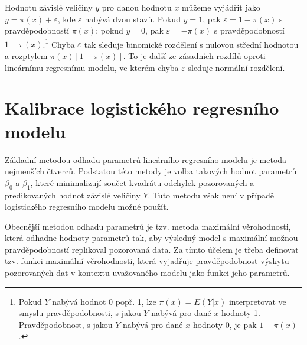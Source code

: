 Hodnotu závislé veličiny $y$ pro danou hodnotu $x$ můžeme vyjádřit jako $y = \pi(x) + \varepsilon$, kde $\varepsilon$ nabývá dvou stavů. Pokud $y = 1$, pak $\varepsilon = 1 -\pi(x)$ s pravděpodobností $\pi(x)$; pokud $y = 0$, pak $\varepsilon = -\pi(x)$ s pravděpodobností $1 - \pi(x)$.\footnote{Pokud $Y$ nabývá hodnot 0 popř. 1, lze $\pi(x) = E(Y | x)$ interpretovat ve smyslu pravděpodobnosti, s jakou $Y$ nabývá pro dané $x$ hodnoty 1. Pravděpodobnost, s jakou $Y$ nabývá pro dané $x$ hodnoty 0, je pak $1 - \pi(x)$.} Chyba $\varepsilon$ tak sleduje binomické rozdělení s nulovou střední hodnotou a rozptylem $\pi(x)[1 - \pi(x)]$. To je další ze zásadních rozdílů oproti lineárnímu regresnímu modelu, ve kterém chyba $\varepsilon$ sleduje normální rozdělení.

\section{Kalibrace logistického regresního modelu}

Základní metodou odhadu parametrů lineárního regresního modelu je metoda nejmenších čtverců. Podstatou této metody je volba takových hodnot parametrů $\beta_0$ a $\beta_1$, které minimalizují součet kvadrátu odchylek pozorovaných a predikovaných hodnot závislé veličiny $Y$. Tuto metodu však není v případě logistického regresního modelu možné použít.

Obecnější metodou odhadu parametrů je tzv. metoda maximální věrohodnosti, která odhadne hodnoty parametrů tak, aby výsledný model s maximální možnou pravděpodobností replikoval pozorovaná data. Za tímto účelem je třeba definovat tzv. funkci maximální věrohodnosti, která vyjadřuje pravděpodobnost výskytu pozorovaných dat v kontextu uvažovaného modelu jako funkci jeho parametrů.

